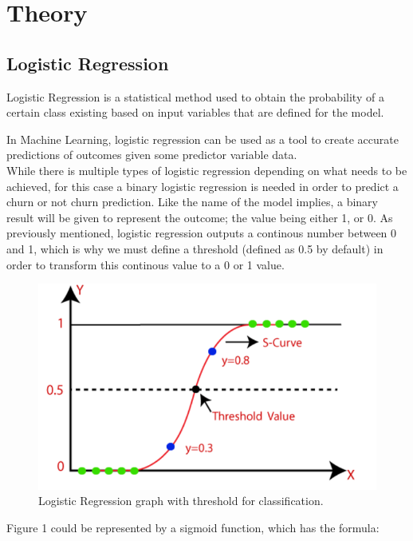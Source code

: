 \documentclass[letterpaper, 10 pt, conference]{ieeeconf}
\begin{document}
\section{ Theory }
\subsection{Logistic Regression}
Logistic Regression is a statistical method used to obtain the probability of a certain class existing based
on input variables that are defined for the model.

In Machine Learning, logistic regression can be used as a tool to create accurate predictions of outcomes given some predictor variable data.
\\


While there is multiple types of logistic  regression depending on what needs to be achieved, for this case a binary logistic regression is needed in order
to predict a churn or not churn prediction. Like the name of the model implies, a binary result will be given to represent the outcome; the value being either 1, or 0.
As previously mentioned, logistic regression outputs a continous number between 0 and 1, which is why we must define a threshold (defined as 0.5 by default) in order to 
transform this continous value to a 0 or 1 value.
\\


\begin{figure}[thpb]
    \centering
    \includegraphics[scale=0.3]{figures/threshold.png}
    \caption{Logistic Regression graph with threshold for classification.}
    \label{logisticThreshold}
 \end{figure}


Figure 1 could be represented by a sigmoid function, which has the formula:
\end{document}
